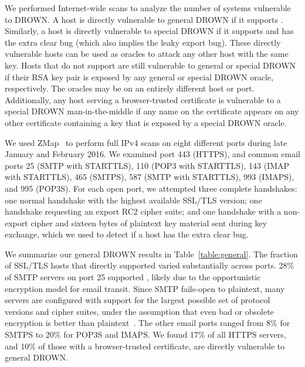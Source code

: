 \label{sec:scans}

We performed Internet-wide scans to analyze the number of systems vulnerable to
DROWN\@. A host is directly vulnerable to general DROWN if it supports \ssltwo.
Similarly, a host is directly vulnerable to special DROWN if it supports
\ssltwo and has the extra clear bug (which also implies the leaky export bug).
These directly vulnerable hosts can be
used as oracles to attack any other host with the same key. Hosts that do not
support \ssltwo are still vulnerable to general or special DROWN if their RSA
key pair is exposed by any general or special DROWN oracle, respectively. The
oracles may be on an entirely different host or port.  Additionally, any host
serving a browser-trusted certificate is vulnerable to a special DROWN
man-in-the-middle if any name on the certificate appears on any other
certificate containing a key that is exposed by a special DROWN oracle.

We used ZMap~\cite{zmap-2013} to perform full IPv4 scans on eight different ports
during late January and February 2016.  We examined port 443 (HTTPS), and
common email ports 25 (SMTP with STARTTLS), 110 (POP3 with STARTTLS), 143 (IMAP
with STARTTLS), 465 (SMTPS), 587 (SMTP with STARTTLS), 993 (IMAPS), and 995
(POP3S).  For each open port, we attempted three complete handshakes: one
normal handshake with the highest available SSL/TLS version; one \ssltwo
handshake requesting an export RC2 cipher suite; and one \ssltwo handshake with
a non-export cipher and sixteen bytes of plaintext key material sent during key
exchange, which we used to detect if a host has the extra clear bug.

We summarize our general DROWN results in Table~\ref{table:general}. The
fraction of SSL/TLS hosts that directly supported \ssltwo varied substantially
across ports. 28\% of SMTP servers on port 25 supported \ssltwo, likely due to
the opportunistic encryption model for email transit. Since SMTP fails-open to
plaintext, many servers are configured with support for the largest possible
set of protocol versions and cipher suites, under the assumption that even bad
or obsolete encryption is better than plaintext~\cite{better-crypto}. The other
email ports ranged from 8\% for SMTPS to 20\% for POP3S and IMAPS. We found
17\% of all HTTPS servers, and 10\% of those with a browser-trusted
certificate, are directly vulnerable to general DROWN\@.

\tabSpecialAll




